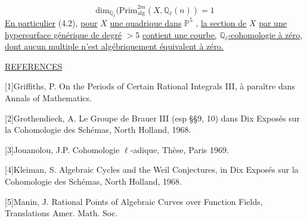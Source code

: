 \begin{equation*}
\mathrm{dim}_{\mathbb{Q}_{\ell}}(\mathrm{Prim}^{2m}_{\mathrm{alg}}(X,\mathbb{Q}_{\ell}(n)) = 1
\end{equation*}
\underline{En particulier} (4.2), \underline{pour} $X$ \underline{une quadrique dans} $\mathbb{P}^5$ , \underline{la section de} $X$ \underline{par une hypersurface générique de degré} $> 5$ \underline{contient une courbe,} $\mathbb{Q}_{\ell}$\underline{-cohomologie à zéro}, \underline{dont aucun multiple n'est algébriquement équivalent à zéro.}


\underline{REFERENCES}

[1]\quad Griffiths, P.  On the Periods of Certain Rational Integrals III, à paraître dans Annals of Mathematics.

[2]\quad Grothendieck, A.  Le Groupe de Brauer III (esp \S\S 9, 10) dans Dix Exposés sur la Cohomologie des Schémas, North Holland, 1968.

[3]\quad Jouanolou, J.P.  Cohomologie $\ell$-adique, Thèse, Paris 1969.

[4]\quad Kleiman, S.  Algebraic Cycles and the Weil Conjectures, in Dix Exposés sur la Cohomologie des Schémas, North Holland, 1968.

[5]\quad Manin, J.  Rational Points of Algebraic Curves over Function Fields, Translations Amer. Math. Soc.
